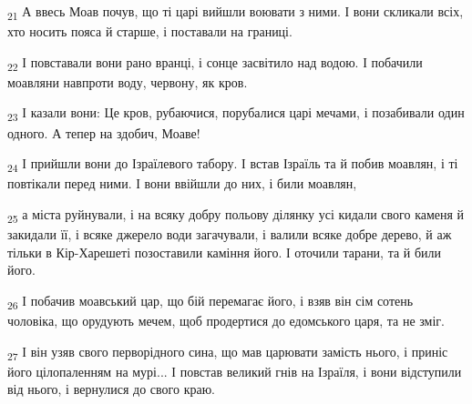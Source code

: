 \begin{tcolorbox}
\textsubscript{21} А ввесь Моав почув, що ті царі вийшли воювати з ними. І вони скликали всіх, хто носить пояса й старше, і поставали на границі.
\end{tcolorbox}
\begin{tcolorbox}
\textsubscript{22} І повставали вони рано вранці, і сонце засвітило над водою. І побачили моавляни навпроти воду, червону, як кров.
\end{tcolorbox}
\begin{tcolorbox}
\textsubscript{23} І казали вони: Це кров, рубаючися, порубалися царі мечами, і позабивали один одного. А тепер на здобич, Моаве!
\end{tcolorbox}
\begin{tcolorbox}
\textsubscript{24} І прийшли вони до Ізраїлевого табору. І встав Ізраїль та й побив моавлян, і ті повтікали перед ними. І вони ввійшли до них, і били моавлян,
\end{tcolorbox}
\begin{tcolorbox}
\textsubscript{25} а міста руйнували, і на всяку добру польову ділянку усі кидали свого каменя й закидали її, і всяке джерело води загачували, і валили всяке добре дерево, й аж тільки в Кір-Харешеті позоставили каміння його. І оточили тарани, та й били його.
\end{tcolorbox}
\begin{tcolorbox}
\textsubscript{26} І побачив моавський цар, що бій перемагає його, і взяв він сім сотень чоловіка, що орудують мечем, щоб продертися до едомського царя, та не зміг.
\end{tcolorbox}
\begin{tcolorbox}
\textsubscript{27} І він узяв свого перворідного сина, що мав царювати замість нього, і приніс його цілопаленням на мурі... І повстав великий гнів на Ізраїля, і вони відступили від нього, і вернулися до свого краю.
\end{tcolorbox}
